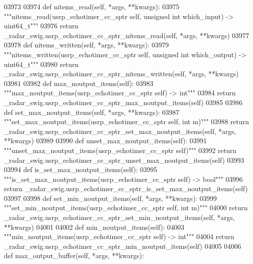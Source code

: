 \begin{DoxyCode}
{{{{{{{{{{{{{{03973 
03974     \textcolor{keyword}{def }nitems_read(self, *args, **kwargs):
03975         \textcolor{stringliteral}{"""nitems\_read(usrp\_echotimer\_cc\_sptr self, unsigned int which\_input) -> uint64\_t"""}
03976         \textcolor{keywordflow}{return} \_radar\_swig.usrp\_echotimer\_cc\_sptr\_nitems\_read(self, *args, **kwargs)
03977 
03978     \textcolor{keyword}{def }nitems_written(self, *args, **kwargs):
03979         \textcolor{stringliteral}{"""nitems\_written(usrp\_echotimer\_cc\_sptr self, unsigned int which\_output) -> uint64\_t"""}
03980         \textcolor{keywordflow}{return} \_radar\_swig.usrp\_echotimer\_cc\_sptr\_nitems\_written(self, *args, **kwargs)
03981 
03982     \textcolor{keyword}{def }max_noutput_items(self):
03983         \textcolor{stringliteral}{"""max\_noutput\_items(usrp\_echotimer\_cc\_sptr self) -> int"""}
03984         \textcolor{keywordflow}{return} \_radar\_swig.usrp\_echotimer\_cc\_sptr\_max\_noutput\_items(self)
03985 
03986     \textcolor{keyword}{def }set_max_noutput_items(self, *args, **kwargs):
03987         \textcolor{stringliteral}{"""set\_max\_noutput\_items(usrp\_echotimer\_cc\_sptr self, int m)"""}
03988         \textcolor{keywordflow}{return} \_radar\_swig.usrp\_echotimer\_cc\_sptr\_set\_max\_noutput\_items(self, *args, **kwargs)
03989 
03990     \textcolor{keyword}{def }unset_max_noutput_items(self):
03991         \textcolor{stringliteral}{"""unset\_max\_noutput\_items(usrp\_echotimer\_cc\_sptr self)"""}
03992         \textcolor{keywordflow}{return} \_radar\_swig.usrp\_echotimer\_cc\_sptr\_unset\_max\_noutput\_items(self)
03993 
03994     \textcolor{keyword}{def }is_set_max_noutput_items(self):
03995         \textcolor{stringliteral}{"""is\_set\_max\_noutput\_items(usrp\_echotimer\_cc\_sptr self) -> bool"""}
03996         \textcolor{keywordflow}{return} \_radar\_swig.usrp\_echotimer\_cc\_sptr\_is\_set\_max\_noutput\_items(self)
03997 
03998     \textcolor{keyword}{def }set_min_noutput_items(self, *args, **kwargs):
03999         \textcolor{stringliteral}{"""set\_min\_noutput\_items(usrp\_echotimer\_cc\_sptr self, int m)"""}
04000         \textcolor{keywordflow}{return} \_radar\_swig.usrp\_echotimer\_cc\_sptr\_set\_min\_noutput\_items(self, *args, **kwargs)
04001 
04002     \textcolor{keyword}{def }min_noutput_items(self):
04003         \textcolor{stringliteral}{"""min\_noutput\_items(usrp\_echotimer\_cc\_sptr self) -> int"""}
04004         \textcolor{keywordflow}{return} \_radar\_swig.usrp\_echotimer\_cc\_sptr\_min\_noutput\_items(self)
04005 
04006     \textcolor{keyword}{def }max_output_buffer(self, *args, **kwargs):
}}}}}}}}}}}}}}
\end{DoxyCode}
